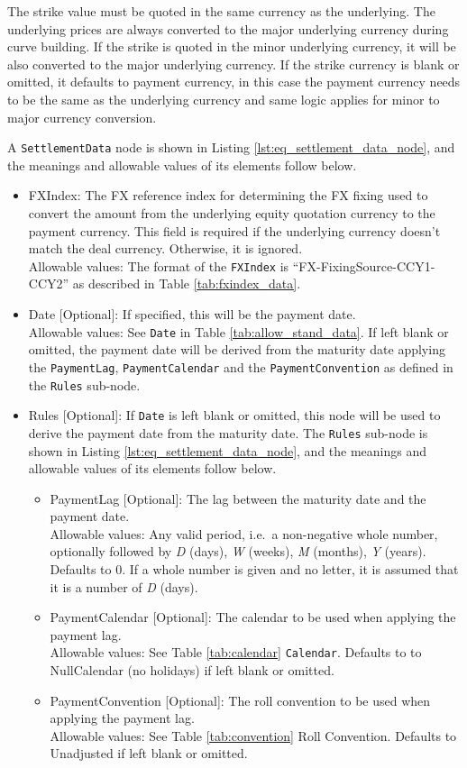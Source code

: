 The strike value must be quoted in the same currency as the underlying. The underlying prices are always converted to the major underlying currency during curve building. 
If the strike is quoted in the minor underlying currency, it will be also converted to the major underlying currency. If the strike
currency is blank or omitted, it defaults to payment currency, in this case the payment currency needs to be the same as the underlying currency and same logic applies for 
minor to major currency conversion.

A \lstinline!SettlementData! node is shown in Listing \ref{lst:eq_settlement_data_node}, and the meanings and allowable values of its elements follow below.

\begin{itemize}
\item FXIndex: The FX reference index for determining the FX fixing used to convert the amount from the underlying equity quotation currency to the payment currency. This field is required if the underlying currency doesn't match the deal currency. Otherwise, it is ignored. \\
Allowable values: The format of the \lstinline!FXIndex! is ``FX-FixingSource-CCY1-CCY2'' as described in Table \ref{tab:fxindex_data}.
\item Date [Optional]: If specified, this will be the payment date. \\
Allowable values: See \lstinline!Date! in Table \ref{tab:allow_stand_data}. If left blank or omitted, the payment date will be derived from the maturity date applying the \lstinline!PaymentLag!, 
\lstinline!PaymentCalendar! and the \lstinline!PaymentConvention! as defined in the \lstinline!Rules! sub-node.
\item Rules [Optional]: If \lstinline!Date! is left blank or omitted, this node will be used to derive the payment date from the maturity date.
The \lstinline!Rules! sub-node is shown in Listing \ref{lst:eq_settlement_data_node}, and the meanings and allowable values of its elements follow below.
  \begin{itemize}
	\item PaymentLag [Optional]: The lag between the maturity date and the payment date. \\
	Allowable values: Any valid period, i.e.\ a non-negative whole number, optionally followed by \emph{D} (days), \emph{W} (weeks), \emph{M} (months),
  \emph{Y} (years).  Defaults to 0. If a whole number is given and no letter, it is assumed that it is a number of  \emph{D} (days).
	\item PaymentCalendar [Optional]: The calendar to be used when applying the payment lag. \\
	Allowable values: See Table \ref{tab:calendar} \lstinline!Calendar!. Defaults to to NullCalendar (no holidays) if left blank or omitted.
	\item PaymentConvention [Optional]: The roll convention to be used when applying the payment lag. \\
	Allowable values: See Table \ref{tab:convention} Roll Convention. Defaults to Unadjusted if left blank or omitted.
  \end{itemize}
\end{itemize}

